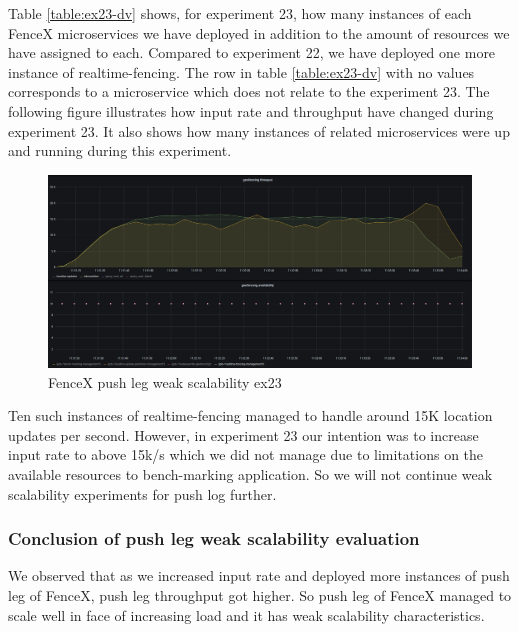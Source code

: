\documentclass[a4]{report}
\begin{document}
    Table \ref{table:ex23-dv} shows, for experiment 23, how many instances of each FenceX microservices we have
    deployed in addition to the amount of resources we have assigned to each.
    Compared to experiment 22, we have deployed one more instance of realtime-fencing.
    The row in table \ref{table:ex23-dv} with no values corresponds to a microservice which does not relate to the
    experiment 23.
    The following figure illustrates how input rate and throughput have changed during experiment 23.
    It also shows how many instances of related microservices were up and running during this experiment.

    \begin{figure}[h!]
        \centering
        \caption{FenceX push leg weak scalability ex23}
        \label{fig:ex23}
        \includegraphics[width=\linewidth, scale=2]{images/evaluation/ex23-benchmarking-ongoing-2per2sec.png}
    \end{figure}

    Ten such instances of realtime-fencing managed to handle around 15K location updates per second.
    However, in experiment 23 our intention was to increase input rate to above 15k/s which we did not manage due to
    limitations on the available resources to bench-marking application.
    So we will not continue weak scalability experiments for push log further.

    \subsubsection{Conclusion of push leg weak scalability evaluation}
    We observed that as we increased input rate and deployed more instances of push leg of FenceX, push leg
    throughput got higher.
    So push leg of FenceX managed to scale well in face of increasing load and it has weak scalability characteristics.
\end{document}
